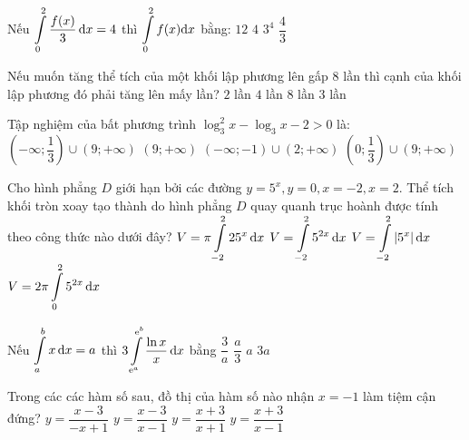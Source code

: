 \begin{ex}%
Nếu $\displaystyle\displaystyle\int\limits_0^2 \dfrac{f(x)}{3} \mathrm{\,d} x=4$ thì $\displaystyle\displaystyle\int\limits_0^2 f(x) \mathrm{d} x$ bằng:
\choice
{\True $12$}
{$4$}
{$3^4$}
{$\dfrac{4}{3}$}

\end{ex}
\begin{ex}%
Nếu muốn tăng thể tích của một khối lập phương lên gấp $8$ lần thì cạnh của khối lập phương đó phải tăng lên mấy lần?
\choice
{\True $2$ lần}
{$4$ lần}
{$8$ lần}
{$3$ lần}

\end{ex}
\begin{ex}%
Tập nghiệm của bất phương trình $\log_3^2 x-\log_3 x-2>0$ là:
\choice
{$\left(-\infty; \dfrac{1}{3}\right) \cup(9;+\infty)$}
{$(9;+\infty)$}
{$(-\infty;-1) \cup(2;+\infty)$}
{\True $\left(0; \dfrac{1}{3}\right) \cup(9;+\infty)$}
\end{ex}
\begin{ex}%
{\vspace{-0.6cm}

}
\end{ex}

\begin{ex}%
Cho hình phẳng $D$ giới hạn bởi các đường $y=5^{x}, y=0, x=-2, x=2$. Thể tích khối tròn xoay tạo thành do hình phẳng $D$ quay quanh trục hoành được tính theo công thức nào dưới đây?
\choice
{\True $V=\pi \displaystyle\displaystyle\int\limits_{-2}^2 25^{x} \mathrm{\,d} x$}
{$V=\displaystyle\displaystyle\int\limits_{-2}^2 5^{2 x} \mathrm{\,d} x$}
{$V=\displaystyle\displaystyle\int\limits_{-2}^2\left|5^{x}\right| \mathrm{d} x$}
{$V=2\pi \displaystyle\displaystyle\int\limits_0^2 5^{2 x} \mathrm{\,d} x$}

\end{ex}
\begin{ex}%
Nếu $\displaystyle\displaystyle\int\limits_a^{b} x\mathrm{\,d}x=a$ thì $3\displaystyle\displaystyle\int\limits_{{\rm e}^{a}}^{{\rm e}^{b}} \dfrac{\ln x}{x}\mathrm{\,d}x$ bằng
\choice
{$\dfrac{3}{a}$}
{$\dfrac{a}{3}$}
{$a$}
{\True $3 a$}

\end{ex}
\begin{ex}%
Trong các các hàm số sau, đồ thị của hàm số nào nhận $x=-1$ làm tiệm cận đứng?
\choice
{$y=\dfrac{x-3}{-x+1}$}
{$y=\dfrac{x-3}{x-1}$}
{\True $y=\dfrac{x+3}{x+1}$}
{$y=\dfrac{x+3}{x-1}$}

\end{ex}
